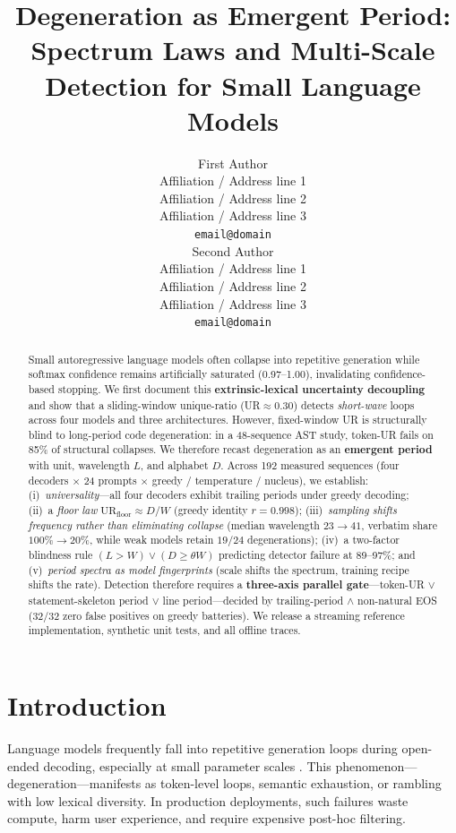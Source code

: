 \documentclass[11pt]{article}
\title{Degeneration as Emergent Period: Spectrum Laws and Multi-Scale Detection for Small Language Models}
\author{First Author \\
  Affiliation / Address line 1 \\
  Affiliation / Address line 2 \\
  Affiliation / Address line 3 \\
  \texttt{email@domain} \\\And
  Second Author \\
  Affiliation / Address line 1 \\
  Affiliation / Address line 2 \\
  Affiliation / Address line 3 \\
  \texttt{email@domain} \\}
\begin{document}
\maketitle

\begin{abstract}
Small autoregressive language models often collapse into repetitive generation while softmax confidence remains artificially saturated (0.97--1.00), invalidating confidence-based stopping. We first document this \textbf{extrinsic-lexical uncertainty decoupling} and show that a sliding-window unique-ratio (UR$\approx$0.30) detects \emph{short-wave} loops across four models and three architectures. However, fixed-window UR is structurally blind to long-period code degeneration: in a 48-sequence AST study, token-UR fails on 85\% of structural collapses. We therefore recast degeneration as an \textbf{emergent period} with unit, wavelength $L$, and alphabet $D$. Across 192 measured sequences (four decoders $\times$ 24 prompts $\times$ greedy / temperature / nucleus), we establish: (i)~\emph{universality}---all four decoders exhibit trailing periods under greedy decoding; (ii)~a \emph{floor law} $\mathrm{UR}_{\mathrm{floor}}\approx D/W$ (greedy identity $r=0.998$); (iii)~\emph{sampling shifts frequency rather than eliminating collapse} (median wavelength $23\!\to\!41$, verbatim share $100\%\!\to\!20\%$, while weak models retain $19/24$ degenerations); (iv)~a two-factor blindness rule $(L>W)\lor(D\geq\theta W)$ predicting detector failure at 89--97\%; and (v)~\emph{period spectra as model fingerprints} (scale shifts the spectrum, training recipe shifts the rate). Detection therefore requires a \textbf{three-axis parallel gate}---token-UR $\lor$ statement-skeleton period $\lor$ line period---decided by trailing-period $\land$ non-natural EOS (32/32 zero false positives on greedy batteries). We release a streaming reference implementation, synthetic unit tests, and all offline traces.
\end{abstract}
\section{Introduction}

Language models frequently fall into repetitive generation loops during open-ended decoding, especially at small parameter scales \citep{holtzman2020}. This phenomenon---degeneration---manifests as token-level loops, semantic exhaustion, or rambling with low lexical diversity. In production deployments, such failures waste compute, harm user experience, and require expensive post-hoc filtering.
\end{document}
